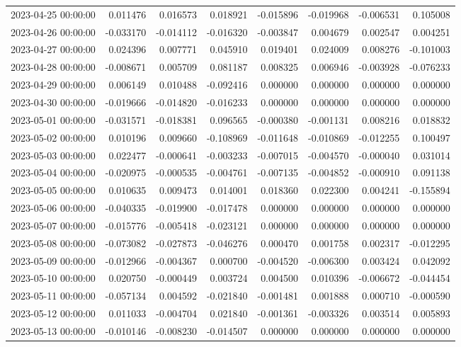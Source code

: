\begin{tabular}{lrrrrrrr}
2023-04-25 00:00:00 & 0.011476 & 0.016573 & 0.018921 & -0.015896 & -0.019968 & -0.006531 & 0.105008 \\
2023-04-26 00:00:00 & -0.033170 & -0.014112 & -0.016320 & -0.003847 & 0.004679 & 0.002547 & 0.004251 \\
2023-04-27 00:00:00 & 0.024396 & 0.007771 & 0.045910 & 0.019401 & 0.024009 & 0.008276 & -0.101003 \\
2023-04-28 00:00:00 & -0.008671 & 0.005709 & 0.081187 & 0.008325 & 0.006946 & -0.003928 & -0.076233 \\
2023-04-29 00:00:00 & 0.006149 & 0.010488 & -0.092416 & 0.000000 & 0.000000 & 0.000000 & 0.000000 \\
2023-04-30 00:00:00 & -0.019666 & -0.014820 & -0.016233 & 0.000000 & 0.000000 & 0.000000 & 0.000000 \\
2023-05-01 00:00:00 & -0.031571 & -0.018381 & 0.096565 & -0.000380 & -0.001131 & 0.008216 & 0.018832 \\
2023-05-02 00:00:00 & 0.010196 & 0.009660 & -0.108969 & -0.011648 & -0.010869 & -0.012255 & 0.100497 \\
2023-05-03 00:00:00 & 0.022477 & -0.000641 & -0.003233 & -0.007015 & -0.004570 & -0.000040 & 0.031014 \\
2023-05-04 00:00:00 & -0.020975 & -0.000535 & -0.004761 & -0.007135 & -0.004852 & -0.000910 & 0.091138 \\
2023-05-05 00:00:00 & 0.010635 & 0.009473 & 0.014001 & 0.018360 & 0.022300 & 0.004241 & -0.155894 \\
2023-05-06 00:00:00 & -0.040335 & -0.019900 & -0.017478 & 0.000000 & 0.000000 & 0.000000 & 0.000000 \\
2023-05-07 00:00:00 & -0.015776 & -0.005418 & -0.023121 & 0.000000 & 0.000000 & 0.000000 & 0.000000 \\
2023-05-08 00:00:00 & -0.073082 & -0.027873 & -0.046276 & 0.000470 & 0.001758 & 0.002317 & -0.012295 \\
2023-05-09 00:00:00 & -0.012966 & -0.004367 & 0.000700 & -0.004520 & -0.006300 & 0.003424 & 0.042092 \\
2023-05-10 00:00:00 & 0.020750 & -0.000449 & 0.003724 & 0.004500 & 0.010396 & -0.006672 & -0.044454 \\
2023-05-11 00:00:00 & -0.057134 & 0.004592 & -0.021840 & -0.001481 & 0.001888 & 0.000710 & -0.000590 \\
2023-05-12 00:00:00 & 0.011033 & -0.004704 & 0.021840 & -0.001361 & -0.003326 & 0.003514 & 0.005893 \\
2023-05-13 00:00:00 & -0.010146 & -0.008230 & -0.014507 & 0.000000 & 0.000000 & 0.000000 & 0.000000 \\

\end{tabular}
